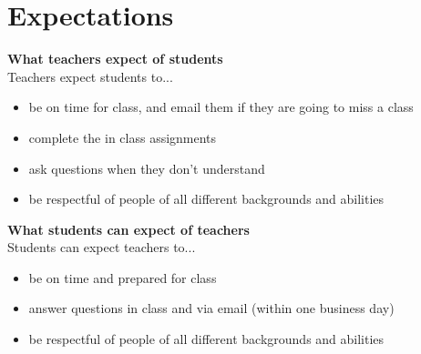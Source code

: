 \documentclass[paper=a4, fontsize=11pt]{scrartcl} %
\numberwithin{equation}{section} %
\numberwithin{figure}{section} %
\numberwithin{table}{section} %
\begin{document}

\section{Expectations}

\textbf{What teachers expect of students}\\
Teachers expect students to...
\begin{itemize}
\item be on time for class, and email them if they are going to miss a class
\item complete the in class assignments
\item ask questions when they don't understand
\item be respectful of people of all different backgrounds and abilities 
\end{itemize}

\textbf{What students can expect of teachers}\\
Students can expect teachers to...
\begin{itemize}
\item be on time and prepared for class
\item answer questions in class and via email (within one business day)
\item be respectful of people of all different backgrounds and abilities 
\end{itemize}
\end{document}
